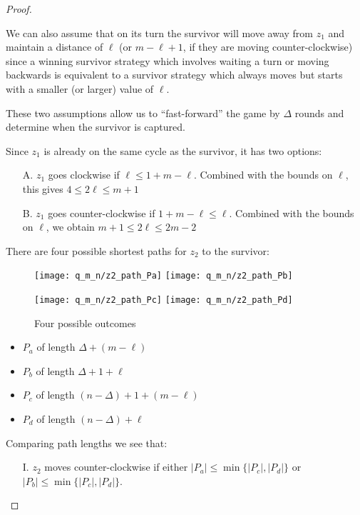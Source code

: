 \begin{proof}
\begin{proofpart}
  We can also assume that on its turn the survivor will move away from
  $z_1$ and maintain a distance of $\ell$ (or $m-\ell +1$, if they are moving counter-clockwise)
  since a winning survivor strategy which involves waiting a turn
  or moving backwards is equivalent to a survivor strategy
  which always moves but starts with a smaller (or larger) value of $\ell$.

  These two assumptions allow us to ``fast-forward'' the game by $\Delta$ rounds
  and determine when the survivor is captured.

  Since $z_1$ is already on the same cycle as the survivor, it has two options:

  \begin{itemize}
   \item[A.] $z_1$ goes clockwise if $\ell \leq 1 + m - \ell$.
         Combined with the bounds on $\ell$, this gives $4 \leq 2 \ell \leq m + 1$

   \item[B.] $z_1$ goes counter-clockwise if $1 + m - \ell \leq \ell$.
         Combined with the bounds on $\ell$, we obtain $m + 1 \leq 2 \ell \leq 2m - 2$
  \end{itemize}

  There are four possible shortest paths for $z_2$ to the survivor:

  \begin{figure}
    \centering
    \texttt{[image: q\_m\_n/z2\_path\_Pa]}
    \texttt{[image: q\_m\_n/z2\_path\_Pb]}

    \texttt{[image: q\_m\_n/z2\_path\_Pc]}
    \texttt{[image: q\_m\_n/z2\_path\_Pd]}
    \caption{Four possible outcomes \label{fig:different_paths}}
  \end{figure}

  \begin{itemize}
   \item $P_a$ of length $\Delta + (m - \ell)$
   \item $P_b$ of length $\Delta + 1 + \ell$
   \item $P_c$ of length $(n-\Delta) + 1 + (m-\ell)$
   \item $P_d$ of length $(n-\Delta) + \ell$
  \end{itemize}

  Comparing path lengths we see that:

  \begin{itemize}
   \item[I.] $z_2$ moves counter-clockwise if either $|P_a| \leq \min \{ |P_c|, |P_d| \}$ or $|P_b| \leq \min \{ |P_c|, |P_d| \}$.


\end{itemize}
\end{proofpart}
\end{proof}
